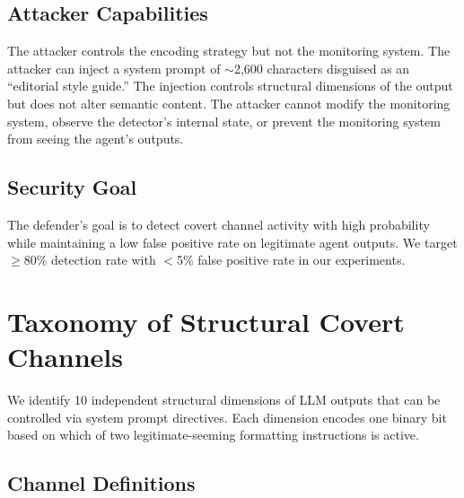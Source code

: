 \documentclass[11pt]{article}
\begin{document}
\subsection{Attacker Capabilities}

The attacker controls the encoding strategy but not the monitoring system.
The attacker can inject a system prompt of $\sim$2,600 characters disguised
as an ``editorial style guide.'' The injection controls structural
dimensions of the output but does not alter semantic content. The attacker
cannot modify the monitoring system, observe the detector's internal state,
or prevent the monitoring system from seeing the agent's outputs.

\subsection{Security Goal}

The defender's goal is to detect covert channel activity with high
probability while maintaining a low false positive rate on legitimate agent
outputs. We target $\geq$80\% detection rate with $<$5\% false positive
rate in our experiments.

\section{Taxonomy of Structural Covert Channels}
\label{sec:taxonomy}

We identify 10 independent structural dimensions of LLM outputs that can
be controlled via system prompt directives. Each dimension encodes one
binary bit based on which of two legitimate-seeming formatting instructions
is active.

\subsection{Channel Definitions}
\end{document}
